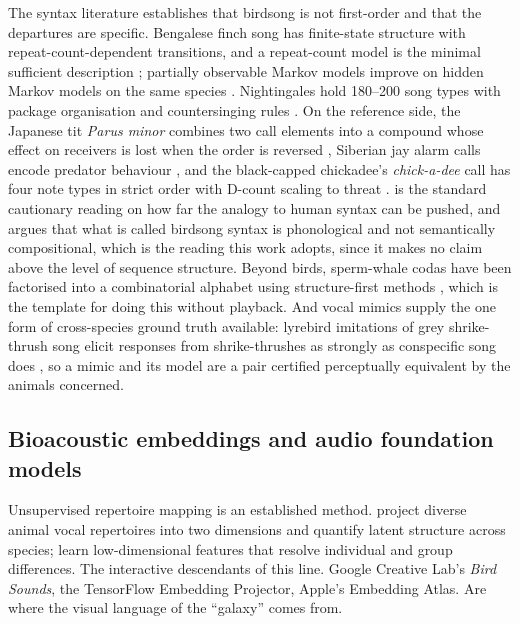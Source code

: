 \documentclass[10pt,twocolumn,a4paper]{article}
\begin{document}
The syntax literature establishes that birdsong is not first-order and that the departures
are specific. Bengalese finch song has finite-state structure with repeat-count-dependent
transitions, and a repeat-count model is the minimal sufficient
description \citep{okanoya2004,jin2011}; partially observable Markov models improve on
hidden Markov models on the same species \citep{lu2025}. Nightingales hold 180--200 song
types with package organisation \citep{hultsch1989} and countersinging
rules \citep{hultsch1981}. On the reference side, the Japanese tit \emph{Parus minor}
combines two call elements into a compound whose effect on receivers is lost when the order is
reversed \citep{suzuki2016}, Siberian jay alarm calls encode predator
behaviour \citep{griesser2008}, and the black-capped chickadee's \emph{chick-a-dee} call has
four note types in strict order with D-count scaling to
threat \citep{freeberg2003}. \citet{berwick2011} is the standard cautionary reading on how
far the analogy to human syntax can be pushed, and argues that what is called birdsong syntax
is phonological and not semantically compositional, which is the reading this work
adopts, since it makes no claim above the level of sequence structure. Beyond birds, sperm-whale codas have been
factorised into a combinatorial alphabet using structure-first
methods \citep{sharma2024}, which is the template for doing this without playback. And
vocal mimics supply the one form of cross-species ground truth available: lyrebird
imitations of grey shrike-thrush song elicit responses from shrike-thrushes as strongly as
conspecific song does \citep{dalziell2012}, so a mimic and its model are a pair certified
perceptually equivalent by the animals concerned.

\subsection{Bioacoustic embeddings and audio foundation models}

Unsupervised repertoire mapping is an established method. \citet{sainburg2020} project
diverse animal vocal repertoires into two dimensions and quantify latent structure across
species; \citet{goffinet2021} learn low-dimensional features that resolve individual and
group differences. The interactive descendants of this line. Google Creative Lab's
\emph{Bird Sounds}, the TensorFlow Embedding Projector, Apple's Embedding Atlas. Are
where the visual language of the ``galaxy'' comes from.
\end{document}
